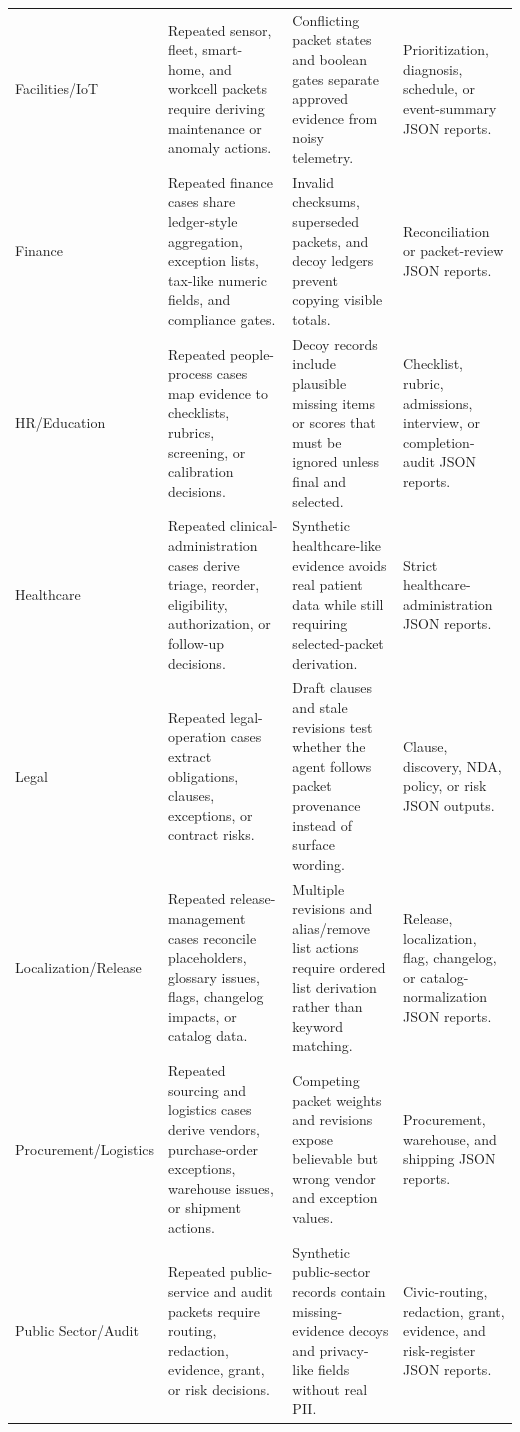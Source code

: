 \documentclass[11pt]{article}
\begin{document}
\begin{longtable}{L{0.18\textwidth}L{0.24\textwidth}L{0.27\textwidth}L{0.23\textwidth}}
Facilities/IoT & Repeated sensor, fleet, smart-home, and workcell packets require deriving maintenance or anomaly actions. & Conflicting packet states and boolean gates separate approved evidence from noisy telemetry. & Prioritization, diagnosis, schedule, or event-summary JSON reports. \\
Finance & Repeated finance cases share ledger-style aggregation, exception lists, tax-like numeric fields, and compliance gates. & Invalid checksums, superseded packets, and decoy ledgers prevent copying visible totals. & Reconciliation or packet-review JSON reports. \\
HR/Education & Repeated people-process cases map evidence to checklists, rubrics, screening, or calibration decisions. & Decoy records include plausible missing items or scores that must be ignored unless final and selected. & Checklist, rubric, admissions, interview, or completion-audit JSON reports. \\
Healthcare & Repeated clinical-administration cases derive triage, reorder, eligibility, authorization, or follow-up decisions. & Synthetic healthcare-like evidence avoids real patient data while still requiring selected-packet derivation. & Strict healthcare-administration JSON reports. \\
Legal & Repeated legal-operation cases extract obligations, clauses, exceptions, or contract risks. & Draft clauses and stale revisions test whether the agent follows packet provenance instead of surface wording. & Clause, discovery, NDA, policy, or risk JSON outputs. \\
Localization/Release & Repeated release-management cases reconcile placeholders, glossary issues, flags, changelog impacts, or catalog data. & Multiple revisions and alias/remove list actions require ordered list derivation rather than keyword matching. & Release, localization, flag, changelog, or catalog-normalization JSON reports. \\
Procurement/Logistics & Repeated sourcing and logistics cases derive vendors, purchase-order exceptions, warehouse issues, or shipment actions. & Competing packet weights and revisions expose believable but wrong vendor and exception values. & Procurement, warehouse, and shipping JSON reports. \\
Public Sector/Audit & Repeated public-service and audit packets require routing, redaction, evidence, grant, or risk decisions. & Synthetic public-sector records contain missing-evidence decoys and privacy-like fields without real PII. & Civic-routing, redaction, grant, evidence, and risk-register JSON reports. \\

\end{longtable}
\end{document}
